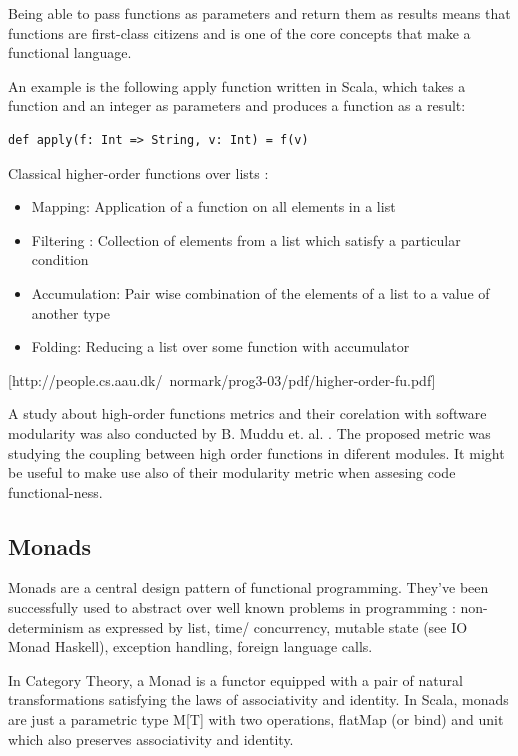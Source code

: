 \documentclass{article}
\begin{document}
Being able to pass functions as parameters and return them as results means that functions are first-class citizens and is one of the  core concepts that make a functional language.

An example is the following apply function written in Scala, which takes a function  and an integer as parameters and produces  a function as a result: \par

\begin{lstlisting} 
def apply(f: Int => String, v: Int) = f(v)
\end{lstlisting} 


Classical higher-order functions over lists :

\begin{itemize}
\item Mapping: Application of a function on all elements in a list
\item Filtering : Collection of elements from a list which satisfy a particular condition
\item Accumulation: Pair wise combination of the elements of a list to a value of
another type
\item Folding: Reducing a list over some function with accumulator
\end{itemize}
[http://people.cs.aau.dk/~normark/prog3-03/pdf/higher-order-fu.pdf]

A study about high-order functions metrics and their corelation with software modularity was also conducted by B. Muddu et. al. \cite{DBLP:conf/icse/MudduABP13}. The proposed metric was studying the coupling between high order functions in diferent modules. It might be useful to make use also of their modularity metric when assesing code functional-ness.\par 

\subsection {Monads}  \label{monads}
Monads are a central design pattern of functional programming. They've been successfully used to abstract over well known problems in programming \cite{Jones01tacklingthe}: non-determinism as expressed by list, time/ concurrency, mutable state (see IO Monad Haskell), exception handling, foreign language calls.

In Category Theory, a Monad is a functor equipped with a pair of natural transformations satisfying the laws of associativity and identity. In Scala, monads are just a parametric type M[T] with two operations, flatMap (or bind) and unit which also preserves associativity and identity. \par
\end{document}
